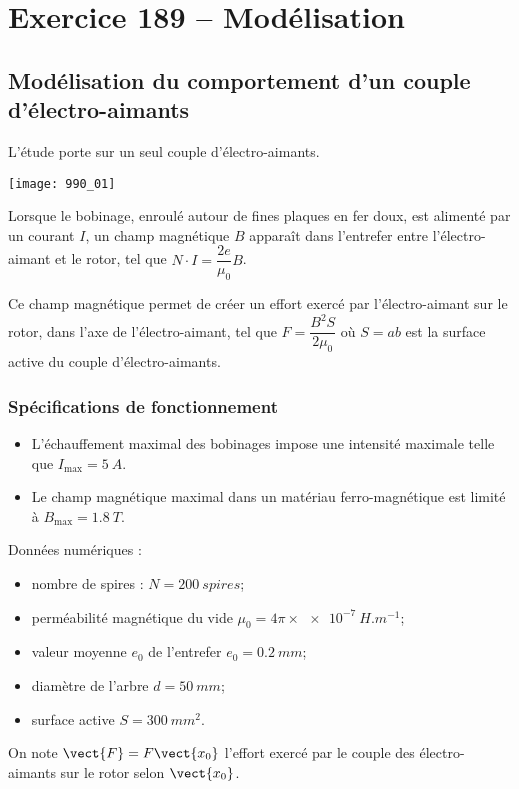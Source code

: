 \section*{Exercice 189 -- Modélisation}
\setcounter{exo}{0}

\subsection*{Modélisation du comportement d’un couple d’électro-aimants}
L'étude porte sur un seul couple d'électro-aimants. 
\begin{center}
\texttt{[image: 990\_01]}
\end{center}

Lorsque le bobinage, enroulé autour de fines plaques en fer doux, est alimenté
par un courant $I$, un champ magnétique $B$ apparaît dans l'entrefer entre
l'électro-aimant et le rotor, tel que $N\cdot I =\dfrac{2e}{\mu_0 }B$.

Ce champ magnétique permet de créer un effort exercé par l'électro-aimant sur
le rotor, dans l'axe de l'électro-aimant, tel que $F=\dfrac{B^2 S}{2\mu_0}$ où $S=ab$ est la surface active du couple d'électro-aimants.


\subsubsection*{Spécifications de fonctionnement}
\begin{itemize}
\item L'échauffement maximal des bobinages impose une intensité maximale telle que $I_{\text{max}}=\SI{5}{A}$.
\item Le champ magnétique maximal dans un matériau ferro-magnétique est limité à $B_{\text{max}}=\SI{1,8}{T}$.
\end{itemize}

Données numériques :
\begin{itemize}
\item nombre de spires : $N=\SI{200}{spires}$;
\item perméabilité magnétique du vide $\mu_0 = 4\pi\times\SI{e-7}{H.m^{-1}}$;
\item valeur moyenne $e_0$ de l'entrefer $e_0=\SI{0,2}{mm}$;
\item diamètre de l'arbre $d=\SI{50}{mm}$;
\item surface active $S=\SI{300}{mm^2}$.
\end{itemize}


On note $\vect{F}=F\vect{x_0}$ l'effort exercé par le couple des électro-aimants sur le rotor
selon $\vect{x_0}$.

